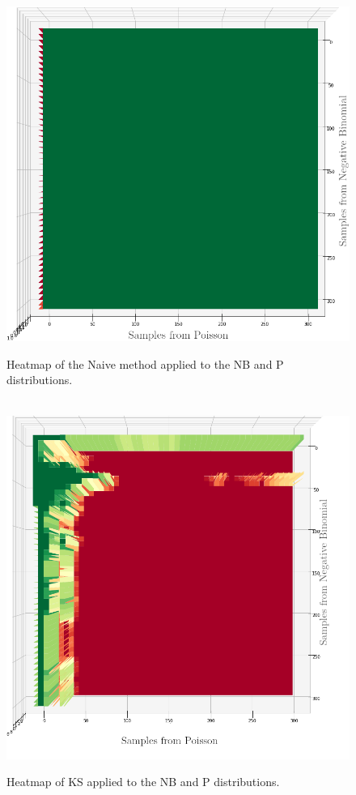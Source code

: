 \begin{figure}[h]
    \centering
    \includegraphics[width=\linewidth]{./img/hypothesis_test/deepar_X_poisson_Y_neg_bin_naive_edited.png}
    \caption{Heatmap of the Naive method applied to the NB and P distributions.}
    \label{naive_negative_bin_poisson}
    \endminipage
    \\
    \includegraphics[width=\linewidth]{./img/hypothesis_test/deepar_heatmap_Y_neg_bin_X_poisson_ks_edited_labels.png}
    \caption{Heatmap of KS applied to the NB and P distributions.}
    \label{ks_neg_bin_poisson}
    \endminipage
\end{figure}
\clearpage

